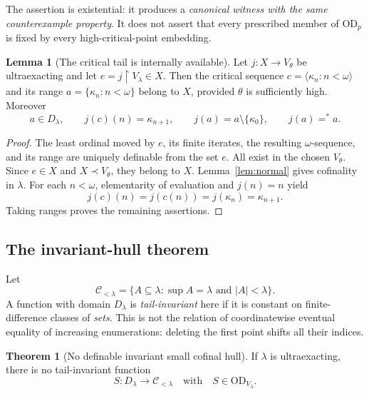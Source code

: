 \documentclass[11pt,letterpaper]{article}
\theoremstyle{definition}
\newtheorem{theorem}[definition]{Theorem}
\newtheorem{lemma}[definition]{Lemma}
\numberwithin{equation}{section}
\newcommand{\OD}{\mathrm{OD}}
\newcommand{\restr}{\mathbin{\upharpoonright}}
\newcommand{\eqfin}{\mathrel{=^{*}}}
\begin{document}
The assertion is existential: it produces a \emph{canonical witness with the same counterexample property}. It does not assert that every prescribed member of $\OD_p$ is fixed by every high-critical-point embedding.

\begin{lemma}[The critical tail is internally available]\label{lem:tail}
Let $j:X\to V_\theta$ be ultraexacting and let
$e=j\restr V_\lambda\in X$. Then the critical sequence
$c=\langle\kappa_n:n<\omega\rangle$ and its range
$a=\{\kappa_n:n<\omega\}$ belong to $X$, provided $\theta$ is sufficiently high. Moreover
\begin{equation}\label{eq:tail}
 a\in D_\lambda,
 \qquad j(c)(n)=\kappa_{n+1},
 \qquad j(a)=a\setminus\{\kappa_0\},
 \qquad j(a)\eqfin a.
\end{equation}
\end{lemma}

\begin{proof}
The least ordinal moved by $e$, its finite iterates, the resulting $\omega$-sequence, and its range are uniquely definable from the set $e$. All exist in the chosen $V_\theta$. Since $e\in X$ and $X\prec V_\theta$, they belong to $X$. Lemma~\ref{lem:normal} gives cofinality in $\lambda$. For each $n<\omega$, elementarity of evaluation and $j(n)=n$ yield
\[
 j(c)(n)=j(c(n))=j(\kappa_n)=\kappa_{n+1}.
\]
Taking ranges proves the remaining assertions.
\end{proof}

\subsection{The invariant-hull theorem}

Let
\[
 \mathcal C_{<\lambda}
 =\{A\subseteq\lambda:\sup A=\lambda\text{ and }|A|<\lambda\}.
\]
A function with domain $D_\lambda$ is \emph{tail-invariant} here if it is constant on finite-difference classes of \emph{sets}. This is not the relation of coordinatewise eventual equality of increasing enumerations: deleting the first point shifts all their indices.

\begin{theorem}[No definable invariant small cofinal hull]\label{thm:hulls}
If $\lambda$ is ultraexacting, there is no tail-invariant function
\[
 S:D_\lambda\longrightarrow\mathcal C_{<\lambda}
 \quad\text{with}\quad S\in\OD_{V_\lambda}.
\]
\end{theorem}
\end{document}
